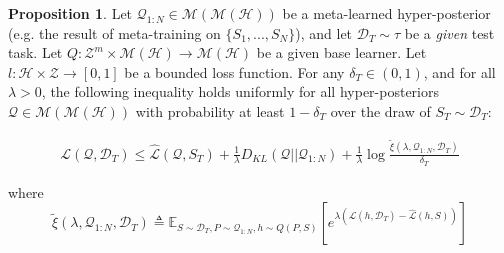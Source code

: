 \documentclass{article}
\theoremstyle{definition}
\newtheorem{proposition}[theorem]{Proposition}
\newcommand{\Expect}[2]{\mathbb{E}_{#1}\left [#2 \right ]}
\begin{document}
\begin{proposition}
	Let $\mathcal{Q}_{1:N}\in \mathcal{M}(\mathcal{M}(\mathcal{H}))$ be a meta-learned hyper-posterior (e.g. the result of meta-training on $\{S_1,...,S_N\}$), and let $\mathcal{D}_T\sim \tau$ be a \emph{given} test task. Let $Q: \mathcal{Z}^m\times\mathcal{M}(\mathcal{H})\rightarrow \mathcal{M}(\mathcal{H})$ be a given base learner. Let $l: \mathcal{H}\times \mathcal{Z}\rightarrow [0, 1]$ be a bounded loss function.
	For any $\delta_T \in (0,1)$, and for all $\lambda>0$, the following inequality holds uniformly for all hyper-posteriors $\mathcal{Q}\in \mathcal{M}(\mathcal{M}(\mathcal{H}))$ with probability at least $1-\delta_T$ over the draw of $S_T\sim \mathcal{D}_T$:
	
	\begin{align}
	\mathcal{L}(\mathcal{Q}, \mathcal{D}_T) \leq \hat{\mathcal{L}}(\mathcal{Q}, S_T) + \frac{1}{\lambda}D_{KL}(\mathcal{Q}||\mathcal{Q}_{1:N})
	+\frac{1}{\lambda}\log\frac{\tilde{\xi}(\lambda,\mathcal{Q}_{1:N},\mathcal{D}_T)}{\delta_T}
	\end{align}
	
	
	where 
	\begin{equation}\label{eq:tilde_xi}
	\tilde{\xi}(\lambda,\mathcal{Q}_{1:N},\mathcal{D}_T)\triangleq \Expect{S\sim \mathcal{D}_T, P\sim \mathcal{Q}_{1:N}, h\sim Q(P,S)}{e^{\lambda\left (\mathcal{L}(h, \mathcal{D}_T)-\hat{\mathcal{L}}(h, S)\right )}}
	\end{equation}
\end{proposition}
\end{document}
